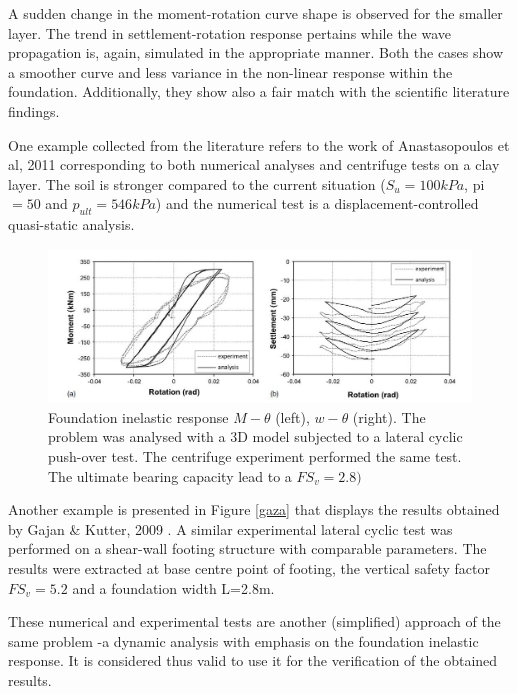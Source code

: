 A sudden change in the moment-rotation curve shape is observed for the smaller layer. The trend in settlement-rotation response pertains while the wave propagation is, again, simulated in the appropriate manner. Both the cases show a smoother curve and less variance in the non-linear response within the foundation. Additionally, they show also a fair match with the scientific literature findings.

One example collected from the literature refers to the work of Anastasopoulos et al, 2011 \cite{anastasopoulos2011simplified} corresponding to both numerical analyses and centrifuge tests on a clay layer. The soil is stronger compared to the current situation ($S_u=100kPa$, \gls{pi}$=50$ and $p_{ult}=546kPa$)  and the numerical test is a displacement-controlled quasi-static analysis. 

\begin{figure}[!h]
	\centering
	\includegraphics[width=0.8 \linewidth]{"example4"}
	\caption{Foundation inelastic response $M-\theta$ (left), $w-\theta$ (right). The problem was analysed with a 3D model subjected to a lateral cyclic push-over test.  The centrifuge experiment performed the same test. The ultimate bearing capacity lead to a  $FS_v=2.8)$}
	\label{gazii}
\end{figure}

Another example is presented in Figure \ref{gaza} that displays the results obtained by Gajan \& Kutter, 2009 \cite{gajan2009effects}. A similar experimental lateral cyclic test was performed on a shear-wall footing structure with comparable parameters. The results were extracted at base centre point of footing, the vertical safety factor $FS_v=5.2$ and a foundation width L=2.8m.

These numerical and experimental tests are another (simplified) approach of the same \mbox{problem} -a dynamic analysis with emphasis on the foundation inelastic response. It is considered thus valid to use it for the verification of the obtained results.
 
